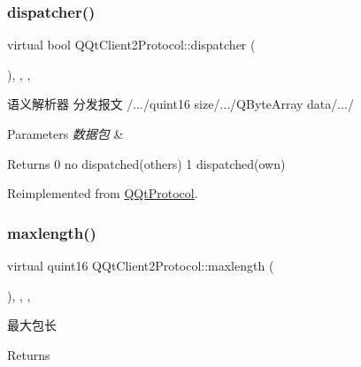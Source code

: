 \subsubsection{\texorpdfstring{dispatcher()}{dispatcher()}}
{\footnotesize\ttfamily virtual bool Q\+Qt\+Client2\+Protocol\+::dispatcher (\begin{DoxyParamCaption}\item[{const Q\+Byte\+Array \&}]{ }\end{DoxyParamCaption})\hspace{0.3cm}{\ttfamily [inline]}, {\ttfamily [override]}, {\ttfamily [protected]}, {\ttfamily [virtual]}}



语义解析器 分发报文 /.../quint16 size/.../\+Q\+Byte\+Array data/.../ 


\begin{DoxyParams}{Parameters}
{\em 数据包} & \\
\hline
\end{DoxyParams}
\begin{DoxyReturn}{Returns}
0 no dispatched(others) 1 dispatched(own) 
\end{DoxyReturn}


Reimplemented from \mbox{\hyperlink{class_q_qt_protocol_a35a69c4b89c8cf7459038f40d75e0dc9}{Q\+Qt\+Protocol}}.

\mbox{\label{class_q_qt_client2_protocol_a4b8afc8d5785c9f7605df38e06a39008}} 
\subsubsection{\texorpdfstring{maxlength()}{maxlength()}}
{\footnotesize\ttfamily virtual quint16 Q\+Qt\+Client2\+Protocol\+::maxlength (\begin{DoxyParamCaption}{ }\end{DoxyParamCaption})\hspace{0.3cm}{\ttfamily [inline]}, {\ttfamily [override]}, {\ttfamily [protected]}, {\ttfamily [virtual]}}



最大包长 

\begin{DoxyReturn}{Returns}

\end{DoxyReturn}


